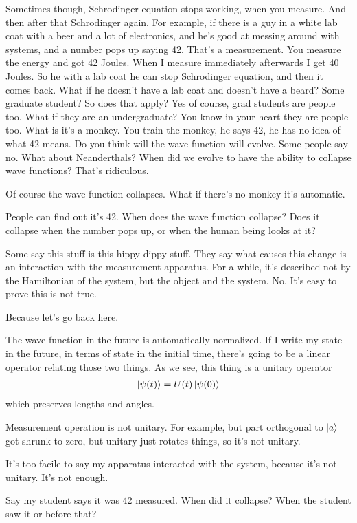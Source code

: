 Sometimes though,
Schrodinger equation stops working,
when you measure.
And then after that Schrodinger again.
For example,
if there is a guy in a white lab coat with a beer
and a lot of electronics,
and he's good at messing around with systems,
and a number pops up saying 42.
That's a measurement.
You measure the energy and got 42 Joules.
When I measure immediately afterwards I get 40 Joules.
So he with a lab coat he can stop Schrodinger equation,
and then it comes back.
What if he doesn't have a lab coat and doesn't have a beard?
Some graduate student?
So does that apply?
Yes of course,
grad students are people too.
What if they are an undergraduate?
You know in your heart they are people too.
What is it's a monkey.
You train the monkey,
he says 42,
he has no idea of what 42 means.
Do you think will the wave function will evolve.
Some people say no.
What about Neanderthals?
When did we evolve to have the ability to collapse wave functions?
That's ridiculous.

Of course the wave function collapses.
What if there's no monkey it's automatic.

People can find out it's 42.
When does the wave function collapse?
Does it collapse when the number pops up,
or when the human being looks at it?

Some say this stuff is this hippy dippy stuff.
They say
what causes this change is an interaction with the measurement apparatus.
For a while,
it's described not by the Hamiltonian of the system,
but the object and the system.
No.
It's easy to prove this is not true.

Because let's go back here.

The wave function in the future is automatically normalized.
If I write my state in the future,
in terms of state in the initial time,
there's going to be a linear operator relating those two things.
As we see, this thing is a unitary operator
\begin{align}
    \ket{\psi(t)} = U(t) \ket{\psi(0)}
\end{align}
which preserves lengths and angles.

Measurement operation is not unitary.
For example,
but part orthogonal to $\ket{a}$ got shrunk to zero,
but unitary just rotates things,
so it's not unitary.

It's too facile to say my apparatus interacted with the system,
because it's not unitary.
It's not enough.


Say my student says it was 42 measured.
When did it collapse?
When the student saw it or before that?

